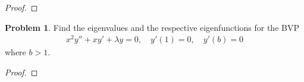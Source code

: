 \documentclass[12pt]{article}
\theoremstyle{definition}
\newtheorem{problem}{Problem}
\begin{document}
\begin{proof}
\end{proof}
\newpage


\begin{problem}
  Find the eigenvalues and the respective eigenfunctions for the BVP
  \begin{align*}
    x^2y'' + xy' + \lambda y = 0, \quad y'(1) = 0, \quad y'(b) = 0
  \end{align*}
  where $b > 1$.
\end{problem}

\begin{proof}
\end{proof}
\end{document}
